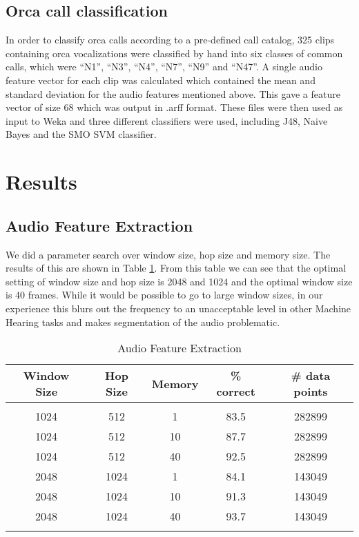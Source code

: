 \subsection{Orca call classification}

In order to classify orca calls according to a pre-defined call
catalog, 325 clips containing orca vocalizations were classified by
hand into six classes of common calls, which were ``N1'', ``N3'',
``N4'', ``N7'', ``N9'' and ``N47''.  A single audio feature vector for
each clip was calculated which contained the mean and standard
deviation for the audio features mentioned above.  This gave a feature
vector of size 68 which was output in .arff format.  These files were
then used as input to Weka and three different classifiers were used,
including J48, Naive Bayes and the SMO SVM classifier.

\section{Results}\label{sec:results}

\subsection{Audio Feature Extraction}

We did a parameter search over window size, hop size and memory size.
The results of this are shown in Table \ref{table:afe}.  From this
table we can see that the optimal setting of window size and hop size
is 2048 and 1024 and the optimal window size is 40 frames.  While it
would be possible to go to large window sizes, in our experience this
blurs out the frequency to an unacceptable level in other Machine
Hearing tasks and makes segmentation of the audio problematic.

\begin{table}
\centering
\caption{Audio Feature Extraction}
\begin{tabular}{ccccc} 
\hline
Window Size & Hop Size & Memory & \% correct & \# data points \\  \hline
\\ 
1024 & 512  & 1  & 83.5 & 282899 \\
1024 & 512  & 10 & 87.7 & 282899 \\
1024 & 512  & 40 & 92.5 & 282899 \\
2048 & 1024 & 1  & 84.1 & 143049 \\
2048 & 1024 & 10 & 91.3 & 143049 \\
2048 & 1024 & 40 & 93.7 & 143049 \\
\\ \hline
\end{tabular}
\label{table:afe}
\end{table}



